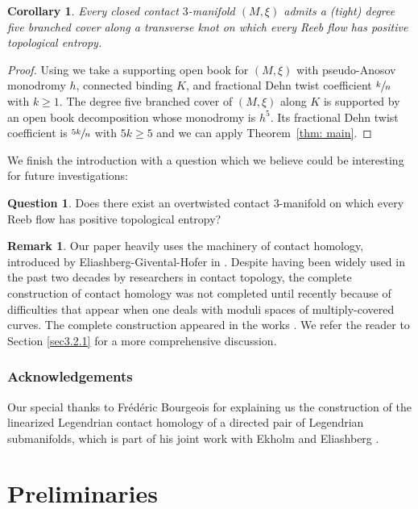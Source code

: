 \documentclass[JEP,XML,SOM,Unicode,NoFloatCountersInSection]{cedram}
\theoremstyle{plain}
\newtheorem{cor}[thm]{Corollary}
\theoremstyle{definition}
\newtheorem{q}[thm]{Question}
\newtheorem{rmk}[thm]{Remark}
\numberwithin{equation}{subsection}
\begin{document}
\begin{cor}
Every closed contact $3$-manifold $(M,\xi)$ admits a (tight) degree five branched cover along a transverse knot on which every Reeb flow has positive topological entropy.
\end{cor}

\begin{proof}
Using \cite{CH1} we take a supporting open book for $(M,\xi)$ with pseudo-Anosov monodromy $h$, connected binding $K$, and fractional Dehn twist coefficient $\sfrac{k}{n}$ with $k\geq 1$. The degree five branched cover of $(M,\xi)$ along $K$ is supported by an open book decomposition whose monodromy is $h^5$. Its fractional Dehn twist coefficient is $\sfrac{5k}{n}$ with $5k\geq 5$ and we can apply Theorem~\ref{thm: main}.
\end{proof}

We finish the introduction with a question which we believe could be interesting for future investigations:

\begin{q}
Does there exist an overtwisted contact $3$-manifold on which every Reeb flow has positive topological entropy?
\end{q}

\begin{rmk}
Our paper heavily uses the machinery of contact homology, introduced by Eliashberg-Givental-Hofer in \cite{SFT}. Despite having been widely used in the past two decades by researchers in contact topology, the complete construction of contact homology was not completed until recently because of difficulties that appear when one deals with moduli spaces of multiply-covered curves. The complete construction appeared in the works \cite{BH,Pa1,HWZ2}. We refer the reader to Section \ref{sec3.2.1} for a more comprehensive discussion.
\end{rmk}

\subsubsection*{Acknowledgements} Our special thanks to Frédéric Bourgeois for explaining us the construction of the linearized Legendrian contact homology of a directed pair of Legendrian submanifolds, which is part of his joint work with Ekholm and Eliashberg \cite{BEE}.

\section{Preliminaries}
\end{document}
